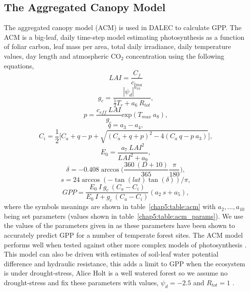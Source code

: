 \subsection{The Aggregated Canopy Model} \label{chap5:sec:ACM}
The aggregated canopy model (ACM) is used in DALEC to calculate GPP. The ACM is a big-leaf, daily time-step model estimating photosynthesis as a function of foliar carbon, leaf mass per area, total daily irradiance, daily temperature values, day length and atmospheric CO\(_{2}\) concentration using the following equations,
\begin{equation}
LAI = \frac{C_f}{c_{lma}} 
\end{equation}
\begin{equation} 
g_c = \frac{|\psi_d|^{a_{10}}}{\frac{1}{2}T_r + a_6~R_{tot}},
\end{equation}
\begin{equation}
p = \frac{c_{eff}~LAI}{g_c}\text{exp}(T_{max}~a_8),
\end{equation}
\begin{equation}
q = a_3 - a_4,
\end{equation}
\begin{equation}
C_i = \frac{1}{2}\bigg[C_a + q - p + \sqrt{(C_a + q + p)^{2} - 4(C_a~q - p~a_3)} \bigg],
\end{equation}
\begin{equation}
E_0 = \frac{a_7~LAI^2}{LAI^2 + a_9},
\end{equation}
\begin{equation}
\delta = -0.408\arccos\bigg(\frac{360~(D+10)}{365}\frac{\pi}{180}\bigg),
\end{equation}
\begin{equation}
s = 24\arccos(-\tan(lat)\tan(\delta))/\pi,
\end{equation}
\begin{equation}
GPP = \frac{E_0~I~g_c~(C_a-C_i)}{E_0~I + g_c~(C_a-C_i)}(a_2~s + a_5),
\end{equation}
where the symbols meanings are shown in table~\ref{chap5:table:acm} with $a_2,\dots ,a_{10}$ being set parameters (values shown in table~\ref{chap5:table:acm_params}). We use the values of the parameters given in \citet{fox2009reflex} as these parameters have been shown to accurately predict GPP for a number of temperate forest sites. The ACM model performs well when tested against other more complex models of photosynthesis \citep{williams1997predicting}. This model can also be driven with estimates of soil-leaf water potential difference and hydraulic resistance, this adds a limit to GPP when the ecosystem is under drought-stress, Alice Holt is a well watered forest so we assume no drought-stress and fix these parameters with values, \(\psi_d = -2.5\) and \(R_{tot} = 1\) \citep{fox2009reflex}.
